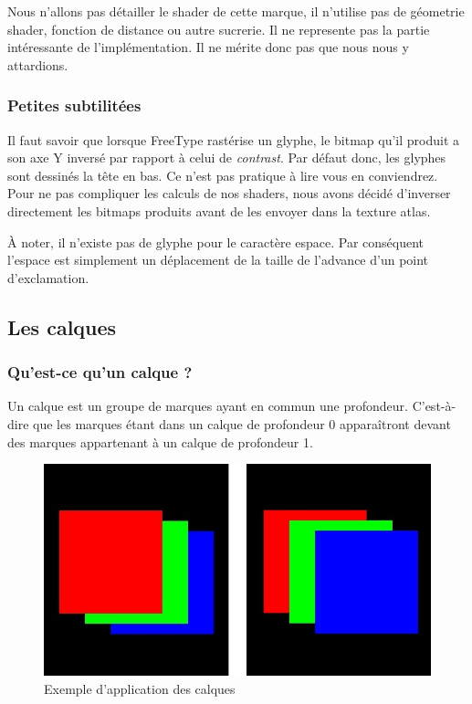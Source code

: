 \documentclass[12pt]{article}
\begin{document}
Nous n'allons pas détailler le shader de cette marque, il n'utilise pas de géometrie shader, fonction de distance ou autre sucrerie.
Il ne represente pas la partie intéressante de l'implémentation. Il ne mérite donc pas que nous nous y attardions.

\subsubsection{Petites subtilitées}

Il faut savoir que lorsque FreeType rastérise un glyphe, le bitmap qu'il produit a son axe Y inversé par rapport à celui de \textit{contrast}. Par défaut donc, les glyphes sont dessinés la tête en bas.
Ce n'est pas pratique à lire vous en conviendrez. Pour ne pas compliquer les calculs de nos shaders, nous avons décidé d'inverser directement les bitmaps produits avant de les envoyer
dans la texture atlas.

À noter, il n'existe pas de glyphe pour le caractère espace. Par conséquent l'espace est simplement un déplacement de la taille de l'advance d'un point d'exclamation.

\subsection{Les calques}
\subsubsection{Qu'est-ce qu'un calque ?}
Un calque est un groupe de marques ayant en commun une profondeur. C'est-à-dire que les marques étant dans
un calque de profondeur 0 apparaîtront devant des marques appartenant à un calque de profondeur 1.

\begin{figure}[htp]
  \centering
  \includegraphics[scale=0.8]{images/calque-exemple}
  \caption{Exemple d'application des calques}
  \label{fig:calque-ex}
\end{figure}
\end{document}
